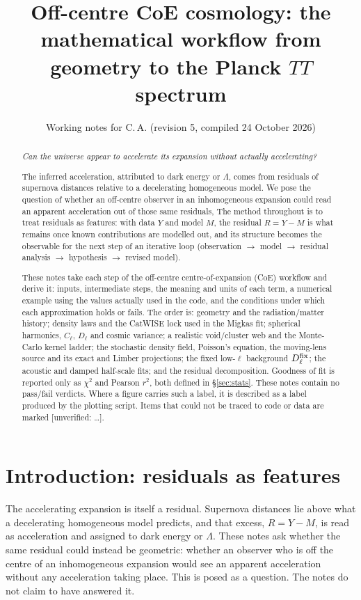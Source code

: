 \documentclass[10pt,twocolumn]{article}
\title{Off-centre CoE cosmology: the mathematical workflow from geometry to the Planck $TT$ spectrum}
\author{Working notes for C.\,A. \quad (revision 5, compiled 24 October 2026)}
\date{}
\newcommand{\flag}[1]{\textsf{[unverified: #1]}}
\begin{document}
\maketitle
\begin{abstract}
\begin{center}\itshape Can the universe appear to accelerate its expansion without actually accelerating?\end{center}
\noindent The inferred acceleration, attributed to dark energy or $\Lambda$, comes from residuals of supernova distances relative to a decelerating homogeneous model. We pose the question of whether an off-centre observer in an inhomogeneous expansion could read an apparent acceleration out of those same residuals, The method throughout is to treat residuals as features: with data $Y$ and model $M$, the residual $R=Y-M$ is what remains once known contributions are modelled out, and its structure becomes the observable for the next step of an iterative loop (observation $\to$ model $\to$ residual analysis $\to$ hypothesis $\to$ revised model).\par\medskip
These notes take each step of the off-centre centre-of-expansion (CoE) workflow and derive it: inputs, intermediate steps, the meaning and units of each term, a numerical example using the values actually used in the code, and the conditions under which each approximation holds or fails. The order is: geometry and the radiation/matter history; density laws and the CatWISE lock used in the Migkas fit; spherical harmonics, $C_\ell$, $D_\ell$ and cosmic variance; a realistic void/cluster web and the Monte-Carlo kernel ladder; the stochastic density field, Poisson's equation, the moving-lens source and its exact and Limber projections; the fixed low-$\ell$ background $D^{\rm fix}_\ell$; the acoustic and damped half-scale fits; and the residual decomposition. Goodness of fit is reported only as $\chi^2$ and Pearson $r^2$, both defined in \S\ref{sec:stats}. These notes contain no pass/fail verdicts. Where a figure carries such a label, it is described as a label produced by the plotting script. Items that could not be traced to code or data are marked \flag{\ldots}.
\end{abstract}

\section*{Introduction: residuals as features}
The accelerating expansion is itself a residual. Supernova distances lie above what a decelerating homogeneous model predicts, and that excess, $R=Y-M$, is read as acceleration and assigned to dark energy or $\Lambda$. These notes ask whether the same residual could instead be geometric: whether an observer who is off the centre of an inhomogeneous expansion would see an apparent acceleration without any acceleration taking place. This is posed as a question. The notes do not claim to have answered it.
\end{document}
